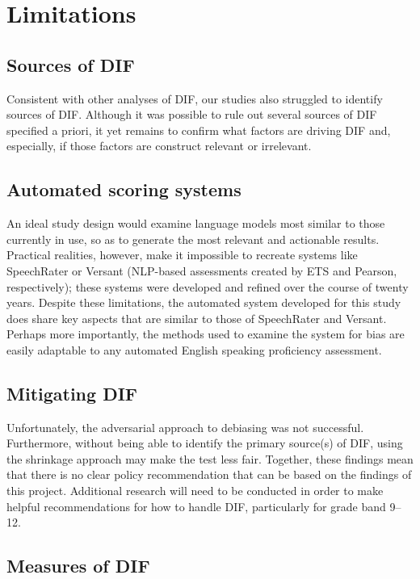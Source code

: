 \documentclass [PhD] {uclathes}
\begin{document}
\section{Limitations}

\subsection{Sources of DIF}

Consistent with other analyses of DIF, our studies also struggled to identify sources of DIF. Although it was possible to rule out several sources of DIF specified a priori, it yet remains to confirm what factors are driving DIF and, especially, if those factors are construct relevant or irrelevant. 

\subsection{Automated scoring systems}

An ideal study design would examine language models most similar to those currently in use, so as to generate the most relevant and actionable results. Practical realities, however, make it impossible to recreate systems like SpeechRater or Versant (NLP-based assessments created by ETS and Pearson, respectively); these systems were developed and refined over the course of twenty years. Despite these limitations, the automated system developed for this study does share key aspects that are similar to those of SpeechRater and Versant. Perhaps more importantly, the methods used to examine the system for bias are easily adaptable to any automated English speaking proficiency assessment.

\subsection{Mitigating DIF}

Unfortunately, the adversarial approach to debiasing was not successful. Furthermore, without being able to identify the primary source(s) of DIF, using the shrinkage approach may make the test less fair. Together, these findings mean that there is no clear policy recommendation that can be based on the findings of this project. Additional research will need to be conducted in order to make helpful recommendations for how to handle DIF, particularly for grade band 9–12. 

\subsection{Measures of DIF}
\end{document}
